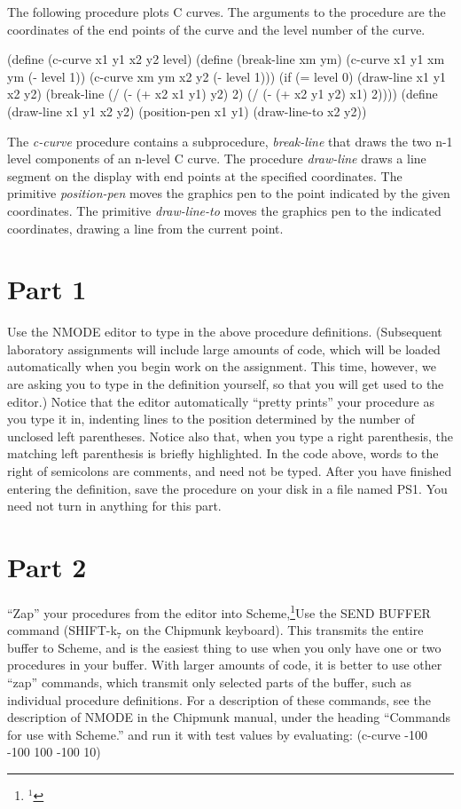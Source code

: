 The following procedure plots C curves.  The arguments to the
procedure are the coordinates of the end points of the curve and the
level number of the curve.

\beginlisp
(define (c-curve x1 y1 x2 y2 level)
  (define (break-line xm ym)
    (c-curve x1 y1 xm ym (- level 1))
    (c-curve xm ym x2 y2 (- level 1)))
  (if (= level 0)
      (draw-line x1 y1 x2 y2)
      (break-line (/ (- (+ x2 x1 y1) y2) 2)
                  (/ (- (+ x2 y1 y2) x1) 2))))
\pbrk
(define (draw-line x1 y1 x2 y2)
  (position-pen x1 y1)
  (draw-line-to x2 y2))
\endlisp

The {\it c-curve} procedure contains a subprocedure, {\it break-line} that
draws the two n-1 level components of an n-level C curve.  The
procedure {\it draw-line} draws a line segment on the display with end
points at the specified coordinates.  The primitive {\it position-pen}
moves the graphics pen to the point indicated by the given
coordinates.  The primitive {\it draw-line-to} moves the graphics pen to
the indicated coordinates, drawing a line from the current point.

\section{Part 1}

Use the NMODE editor to type in the above procedure
definitions.  (Subsequent laboratory assignments will include large
amounts of code, which will be loaded automatically when you begin work
on the assignment.  This time, however, we are asking you to type in
the definition yourself, so that you will get used to the editor.)
Notice that the editor automatically ``pretty prints'' your procedure as
you type it in, indenting lines to the position determined by the
number of unclosed left parentheses.  Notice also that, when you type
a right parenthesis, the matching left parenthesis is briefly
highlighted.  In the code above, words to the right of semicolons are
comments, and need not be typed.  After you have finished entering the
definition, save the procedure on your disk in a file named PS1.
You need not turn in anything for this part.

\section{Part 2}
``Zap'' your procedures from the editor into Scheme,\footnote{$^1$}{Use the
SEND BUFFER command (SHIFT-k$_7$ on the Chipmunk keyboard).
This transmits the entire buffer to Scheme, and is the easiest thing
to use when you only have one or two procedures in your buffer.  With
larger amounts of code, it is better to use other ``zap'' commands,
which transmit only selected parts of the buffer, such as individual
procedure definitions.  For a description of these commands, see the
description of NMODE in the Chipmunk manual, under the heading
``Commands for use with Scheme.''} and run it
with test values by evaluating:
\beginlisp
(c-curve -100 -100 100 -100 10)
\endlisp

